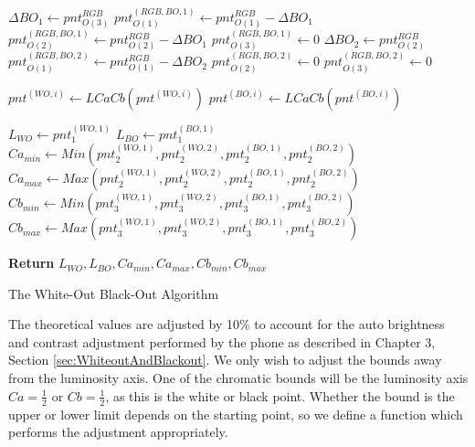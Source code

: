 \begin{algorithm}[H]
\begin{algorithmic}
     
   \State  $\Delta BO_1 \gets  pnt^{RGB}_{O(3)} $ 
   \State  \phantom{Set}$pnt^{(RGB, BO, 1)}_{O(1)} \gets  pnt^{RGB} _{O(1)} - \Delta BO_1  $ 
   \State \phantom{Set} $pnt^{(RGB, BO, 1)}_{O(2)} \gets  pnt^{RGB} _{O(2)} - \Delta BO_1 $ 
   \State \phantom{Set} $pnt^{(RGB, BO, 1)}_{O(3)} \gets  0 $ 
   \State  $\Delta BO_2 \gets pnt^{RGB}_{O(2)} $ 
   \State  \phantom{Set} $pnt^{(RGB, BO, 2)}_{O(1)} \gets pnt^{RGB} _{O(1)} - \Delta BO_2 $ 
   \State  \phantom{Set} $pnt^{(RGB, BO, 2)}_{O(2)} \gets 0 $ 
   \State  \phantom{Set} $pnt^{(RGB, BO, 2)}_{O(3)} \gets 0 $ 
     
   \State  $pnt^{(WO, i)}\gets LCaCb(pnt^{(WO, i)}) $ 
   \State  $pnt^{(BO, i)}\gets LCaCb(pnt^{(BO, i)}) $ 
   
   \State  $L_{WO} \gets pnt^{(WO, 1)}_1$ 
   \State  $L_{BO} \gets pnt^{(BO, 1)}_1$ 
   \State  $Ca_{min}  \gets Min(pnt^{(WO, 1)}_2, pnt^{(WO, 2)}_2, pnt^{(BO, 1)}_2, pnt^{(BO, 2)}_2 )$ 
   \State  $Ca_{max} \gets Max(pnt^{(WO, 1)}_2, pnt^{(WO, 2)}_2, pnt^{(BO, 1)}_2, pnt^{(BO, 2)}_2 )$ 
   \State  $Cb_{min}  \gets Min(pnt^{(WO, 1)}_3, pnt^{(WO, 2)}_3, pnt^{(BO, 1)}_3, pnt^{(BO, 2)}_3 )$ 
   \State  $Cb_{max} \gets Max(pnt^{(WO, 1)}_3, pnt^{(WO, 2)}_3, pnt^{(BO, 1)}_3, pnt^{(BO, 2)}_3 )$ 
     
  \State \textbf{Return} {$L_{WO} , L_{BO} , Ca_{min}, Ca_{max} , Cb_{min}, Cb_{max}$ }
 
  \end{algorithmic}
    \caption{The White-Out Black-Out Algorithm}
    \label{algo:TheWhiteoutBlackoutAlgorithm}
 \end{algorithm}
 
 The theoretical values are adjusted by 10\% to account for the auto brightness and contrast adjustment performed by the phone as described in Chapter 3, Section \ref{sec:WhiteoutAndBlackout}. We only wish to adjust the bounds away from the luminosity axis. One of the chromatic bounds will be the luminosity axis $Ca=\frac{1}{2}$ or  $Cb=\frac{1}{2}$, as this is the white or black point. Whether the bound is the upper or lower limit depends on the starting point, so we define a function which performs the adjustment appropriately.
 
